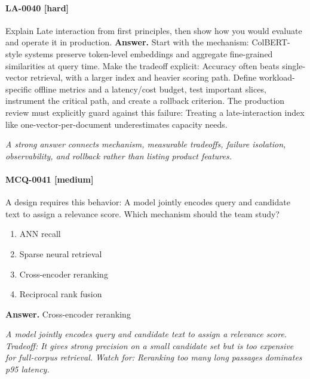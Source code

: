 \paragraph{LA-0040 [hard]} Explain Late interaction from first principles, then show how you would evaluate and operate it in production.
\noindent\textbf{Answer.} Start with the mechanism: ColBERT-style systems preserve token-level embeddings and aggregate fine-grained similarities at query time. Make the tradeoff explicit: Accuracy often beats single-vector retrieval, with a larger index and heavier scoring path. Define workload-specific offline metrics and a latency/cost budget, test important slices, instrument the critical path, and create a rollback criterion. The production review must explicitly guard against this failure: Treating a late-interaction index like one-vector-per-document underestimates capacity needs.
\par\textit{A strong answer connects mechanism, measurable tradeoffs, failure isolation, observability, and rollback rather than listing product features.}
\paragraph{MCQ-0041 [medium]} A design requires this behavior: A model jointly encodes query and candidate text to assign a relevance score. Which mechanism should the team study?
\begin{enumerate}[label=\Alph*.]
\item ANN recall
\item Sparse neural retrieval
\item Cross-encoder reranking
\item Reciprocal rank fusion
\end{enumerate}
\noindent\textbf{Answer.} Cross-encoder reranking
\par\textit{A model jointly encodes query and candidate text to assign a relevance score. Tradeoff: It gives strong precision on a small candidate set but is too expensive for full-corpus retrieval. Watch for: Reranking too many long passages dominates p95 latency.}
